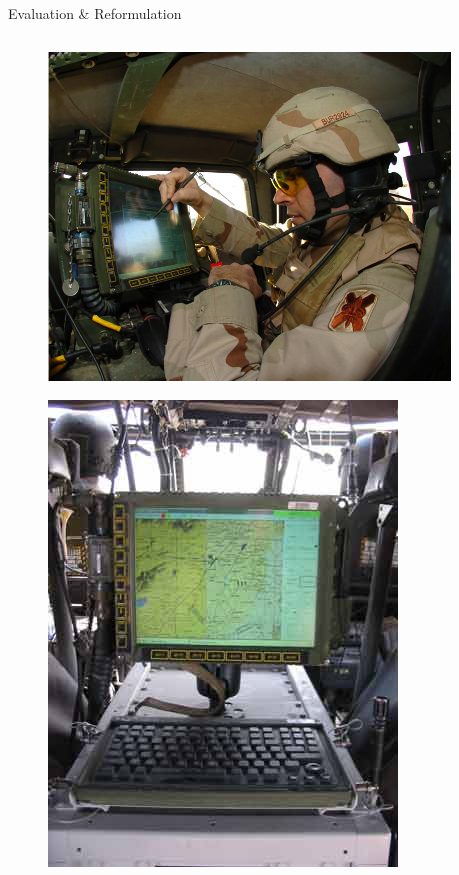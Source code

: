 \documentclass{beamer}
\begin{document}
    \begin{frame}{Evaluation \& Reformulation}
      \begin{columns}
        \begin{column}{0.5\textwidth}
          \vspace{-10pt}
          \begin{figure}[ht] \centering
            \includegraphics[width=0.7\columnwidth] {../graphics/bft_usage.jpg}
          \end{figure}
          \vspace{-10pt}
          \begin{figure}[ht] \centering
            \includegraphics[width=0.6\columnwidth] {../graphics/bft_mount_screen.jpg}
          \end{figure}
        \end{column}
        \begin{column}{0.5\textwidth}

\end{column}
\end{columns}
\end{frame}
\end{document}
